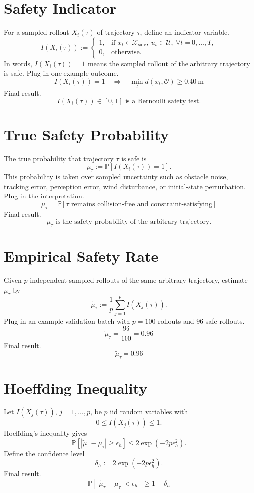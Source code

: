 \documentclass[11pt]{article}
\begin{document}
\section*{Safety Indicator}

For a sampled rollout \(X_i(\tau)\) of trajectory \(\tau\), define an indicator variable.
\[
I(X_i(\tau)) :=
\begin{cases}
1, & \text{if } x_t\in\mathcal X_{\mathrm{safe}},\ u_t\in\mathcal U,\ \forall t=0,\ldots,T,\\
0, & \text{otherwise.}
\end{cases}
\]
In words, \(I(X_i(\tau))=1\) means the sampled rollout of the arbitrary trajectory is safe.
Plug in one example outcome.
\[
I(X_i(\tau))=1
\quad\Rightarrow\quad
\min_t d(x_t,\mathcal O)\ge0.40\ \mathrm{m}
\]
Final result.
\[
\boxed{I(X_i(\tau))\in[0,1]\text{ is a Bernoulli safety test.}}
\]

\section*{True Safety Probability}

The true probability that trajectory \(\tau\) is safe is
\[
\mu_\tau := \mathbb P[I(X_i(\tau))=1].
\]
This probability is taken over sampled uncertainty such as obstacle noise, tracking error, perception error, wind disturbance, or initial-state perturbation.
Plug in the interpretation.
\[
\mu_\tau
=
\mathbb P[
\tau \text{ remains collision-free and constraint-satisfying}
]
\]
Final result.
\[
\boxed{\mu_\tau\text{ is the safety probability of the arbitrary trajectory.}}
\]

\section*{Empirical Safety Rate}

Given \(p\) independent sampled rollouts of the same arbitrary trajectory, estimate \(\mu_\tau\) by
\[
\tilde\mu_\tau
:=
\frac{1}{p}
\sum_{j=1}^{p}
I(X_j(\tau)).
\]
Plug in an example validation batch with \(p=100\) rollouts and \(96\) safe rollouts.
\[
\tilde\mu_\tau
=
\frac{96}{100}
=0.96
\]
Final result.
\[
\boxed{\tilde\mu_\tau=0.96}
\]

\section*{Hoeffding Inequality}

Let \(I(X_j(\tau))\), \(j=1,\ldots,p\), be \(p\) iid random variables with
\[
0\le I(X_j(\tau))\le1.
\]
Hoeffding's inequality gives
\[
\mathbb P\left[
\left|\tilde\mu_\tau-\mu_\tau\right|
\ge
\epsilon_h
\right]
\le
2\exp(-2p\epsilon_h^2).
\]
Define the confidence level
\[
\delta_h:=2\exp(-2p\epsilon_h^2).
\]
Final result.
\[
\boxed{
\mathbb P\left[
\left|\tilde\mu_\tau-\mu_\tau\right|<\epsilon_h
\right]
\ge
1-\delta_h
}
\]
\end{document}
